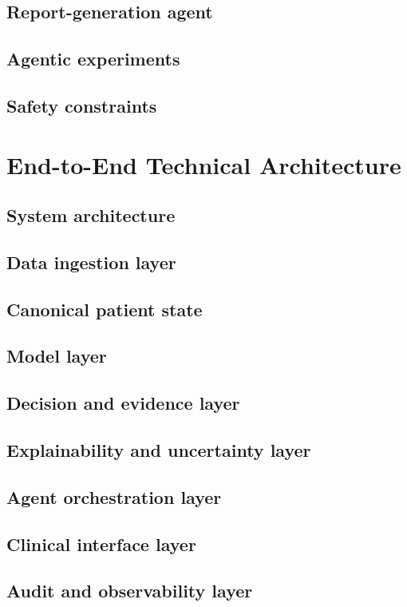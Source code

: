 \documentclass[11pt,journal,onecolumn,draftclsnofoot]{IEEEtran}
\begin{document}
\subsection{Report-generation agent}
\subsection{Agentic experiments}
\subsection{Safety constraints}

\section{End-to-End Technical Architecture}
\subsection{System architecture}
\subsection{Data ingestion layer}
\subsection{Canonical patient state}
\subsection{Model layer}
\subsection{Decision and evidence layer}
\subsection{Explainability and uncertainty layer}
\subsection{Agent orchestration layer}
\subsection{Clinical interface layer}
\subsection{Audit and observability layer}
\end{document}
